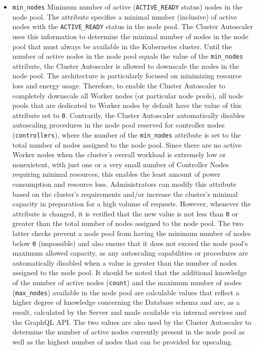 \begin{itemize}
  \item \texttt{min\_nodes}
    \newline
    Minimum number of active (\texttt{ACTIVE\_READY} status) nodes in the node pool.
    \newline
    The attribute specifies a minimal number (inclusive) of active nodes with
    the \texttt{ACTIVE\_READY} status in the node pool.
    \newline
    The Cluster Autoscaler uses this information to determine the minimal number
    of nodes in the node pool that must always be available in the Kubernetes
    cluster. Until the number of active nodes in the node pool equals the value of
    the \texttt{min\_nodes} attribute, the Cluster Autoscaler is allowed to downscale
    the nodes in the node pool.
    \newline
    The architecture is particularly focused on minimizing resource loss and
    energy usage. Therefore, to enable the Cluster Autoscaler to completely
    downscale all Worker nodes (or particular node pools), all node pools that are
    dedicated to Worker nodes by default have the value of this attribute set to
    \texttt{0}. Contrarily, the Cluster Autoscaler automatically disables
    autoscaling procedures in the node pool reserved for controller nodes (\texttt{controllers}),
    where the number of the \texttt{min\_nodes} attribute is set to the total number
    of nodes assigned to the node pool. Since there are no active Worker nodes
    when the cluster's overall workload is extremely low or nonexistent, with just
    one or a very small number of Controller Nodes requiring minimal resources,
    this enables the least amount of power consumption and resource loss.
    \newline
    Administrators can modify this attribute based on the cluster's requirements
    and/or increase the cluster's minimal capacity in preparation for a high volume
    of requests. However, whenever the attribute is changed, it is verified that
    the new value is not less than \texttt{0} or greater than the total number of
    nodes assigned to the node pool. The two latter checks prevent a node pool
    from having the minimum number of nodes below \texttt{0} (impossible) and also
    ensure that it does not exceed the node pool's maximum allowed capacity, as
    any autoscaling capabilities or procedures are automatically disabled when a
    value is greater than the number of nodes assigned to the node pool.
    \newline
    It should be noted that the additional knowledge of the number of active nodes
    (\texttt{count}) and the maximum number of nodes (\texttt{max\_nodes}) available
    in the node pool are calculable values that reflect a higher degree of knowledge
    concerning the Database schema and are, as a result, calculated by the Server
    and made available via internal services and the GraphQL API. The two values
    are also used by the Cluster Autoscaler to determine the number of active
    nodes currently present in the node pool as well as the highest number of
    nodes that can be provided for upscaling.


\end{itemize}
